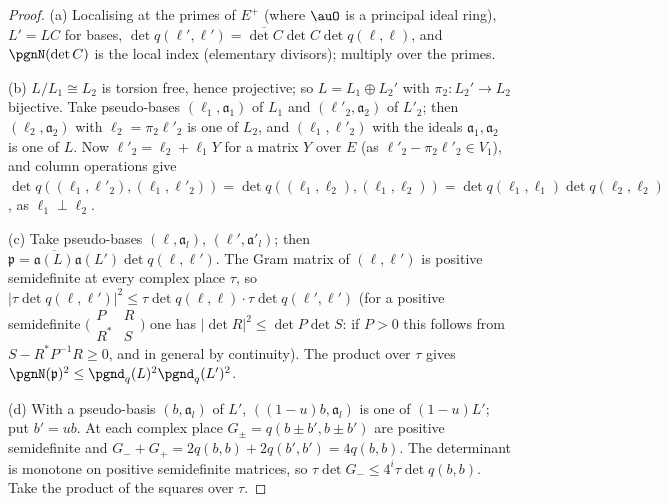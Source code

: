 \documentclass[10pt]{amsart}
\theoremstyle{definition}
\theoremstyle{remark}
\newcommand{\R}{\mathbb R}
\providecommand{\aubar}[1]{\overline{#1}}
\begin{document}
\begin{proof}
(a) Localising at the primes of $E^+$ (where $\auO$ is a principal ideal ring), $L'=L C$ for bases,
$\det q(\ell',\ell')=\aubar{\det C}\det C\det q(\ell,\ell)$, and $\pgnN(\det C)$ is the local index
(elementary divisors); multiply over the primes.

(b) $L/L_1\cong L_2$ is torsion free, hence projective; so $L=L_1\oplus L_2'$ with $\pi_2:L_2'\to L_2$
bijective. Take pseudo-bases $(\ell_1,\mathfrak a_1)$ of $L_1$ and $(\ell'_2,\mathfrak a_2)$ of $L'_2$;
then $(\ell_2,\mathfrak a_2)$ with $\ell_2=\pi_2\ell'_2$ is one of $L_2$, and $(\ell_1,\ell'_2)$ with
the ideals $\mathfrak a_1,\mathfrak a_2$ is one of $L$. Now $\ell'_2=\ell_2+\ell_1Y$ for a matrix $Y$
over $E$ (as $\ell'_2-\pi_2\ell'_2\in V_1$), and column operations give $\det q((\ell_1,\ell'_2),(\ell_1,
\ell'_2))=\det q((\ell_1,\ell_2),(\ell_1,\ell_2))=\det q(\ell_1,\ell_1)\det q(\ell_2,\ell_2)$, as
$\ell_1\perp\ell_2$.

(c) Take pseudo-bases $(\ell,\mathfrak a_l)$, $(\ell',\mathfrak a'_l)$; then $\mathfrak p=\aubar{\mathfrak
a(L)}\mathfrak a(L')\det q(\ell,\ell')$. The Gram matrix of $(\ell,\ell')$ is positive semidefinite at
every complex place $\tau$, so $|\tau\det q(\ell,\ell')|^2\le\tau\det q(\ell,\ell)\cdot\tau\det q(\ell',
\ell')$ (for a positive semidefinite $\bigl(\begin{smallmatrix}P&R\\R^*&S\end{smallmatrix}\bigr)$ one has
$|\det R|^2\le\det P\det S$: if $P>0$ this follows from $S-R^*P^{-1}R\ge0$, and in general by
continuity). The product over $\tau$ gives $\pgnN(\mathfrak p)^2\le\pgnd_q(L)^2\pgnd_q(L')^2$.

(d) With a pseudo-basis $(b,\mathfrak a_l)$ of $L'$, $((1-u)b,\mathfrak a_l)$ is one of $(1-u)L'$; put
$b'=ub$. At each complex place $G_\pm=q(b\pm b',b\pm b')$ are positive semidefinite and $G_-+G_+=
2q(b,b)+2q(b',b')=4q(b,b)$. The determinant is monotone on positive semidefinite matrices, so
$\tau\det G_-\le4^i\tau\det q(b,b)$. Take the product of the squares over $\tau$.
\end{proof}
\end{document}
